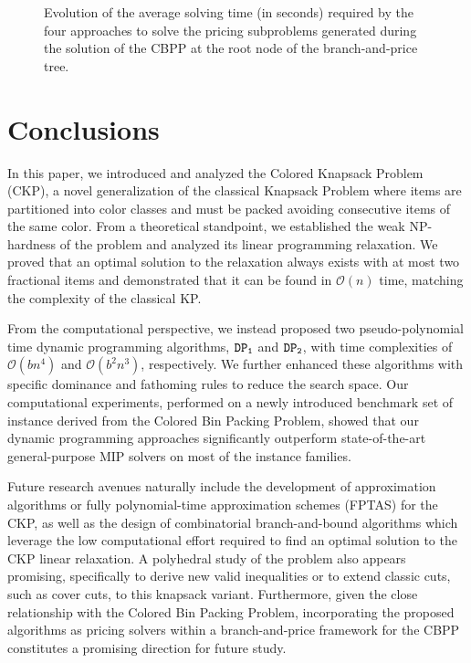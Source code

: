 \documentclass[preprint,11pt]{elsarticle}
\newcommand{\firstDP}{{\tt DP_1}}
\newcommand{\secondDP}{{\tt DP_2}}
\theoremstyle{definition}
\begin{document}
\begin{figure}
    \centering
    
    \caption{Evolution of the average solving time (in seconds) required by the four approaches to solve the pricing subproblems generated during the solution of the CBPP at the root node of the branch-and-price tree.} 
    \label{fig:pricing_times}
\end{figure}






\section{Conclusions}
\label{sec:conclusions}

In this paper, we introduced and analyzed the Colored Knapsack Problem (CKP), a novel generalization of the classical Knapsack Problem where items are partitioned into color classes and must be packed avoiding consecutive items of the same color. From a theoretical standpoint, we established the weak NP-hardness of the problem and analyzed its linear programming relaxation. We proved that an optimal solution to the relaxation always exists with at most two fractional items and demonstrated that it can be found in $\mathcal{O}(n)$ time, matching the complexity of the classical KP.

From the computational perspective, we instead proposed two pseudo-polynomial time dynamic programming algorithms, $\firstDP$ and $\secondDP$, with time complexities of $\mathcal{O}(bn^4)$ and $\mathcal{O}(b^{2}n^{3})$, respectively. We further enhanced these algorithms with specific dominance and fathoming rules to reduce the search space. Our computational experiments, performed on a newly introduced benchmark set of instance derived from the Colored Bin Packing Problem, showed that our dynamic programming approaches significantly outperform state-of-the-art general-purpose MIP solvers on most of the instance families.

Future research avenues naturally include the development of approximation algorithms or fully polynomial-time approximation schemes (FPTAS) for the CKP, as well as the design of combinatorial branch-and-bound algorithms which leverage the low computational effort required to find an optimal solution to the CKP linear relaxation.
A polyhedral study of the problem also appears promising, specifically to derive new valid inequalities or to extend classic cuts, such as cover cuts, to this knapsack variant.
Furthermore, given the close relationship with the Colored Bin Packing Problem, incorporating the proposed algorithms as pricing solvers within a branch-and-price framework for the CBPP constitutes a promising direction for future study.
\end{document}
